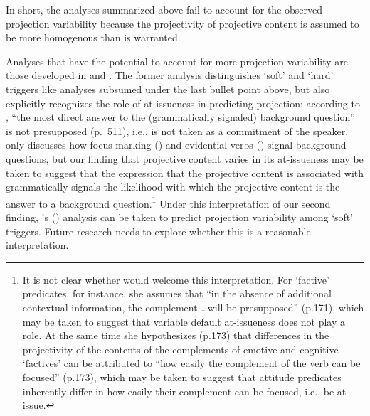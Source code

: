 \documentclass[11pt,fleqn]{article}
\newcommand{\6}{\mbox{$[\hspace*{-.6mm}[$}}
\newcommand{\9}{\mbox{$]\hspace*{-.6mm}]$}}
\newcommand{\citetpos}[1]{\citeauthor{#1}'s (\citeyear{#1})}
\begin{document}
In short, the analyses summarized above fail to account for the observed projection variability because the projectivity of projective content is assumed to be more homogenous than is warranted. 

Analyses that have the potential to account for more projection variability are those developed in \citealt{abrusan2011} and \citealt{abrusan2016}. The former analysis distinguishes `soft' and `hard' triggers like analyses subsumed under the last bullet point above, but also explicitly recognizes the role of at-issueness in predicting projection: according to \citealt{abrusan2011}, ``the most direct answer to the (grammatically signaled) background question'' is not presupposed (p.\ 511), i.e., is not taken as a commitment of the speaker.  \citet{abrusan2011} only discusses how focus marking (\citealt{beaver-belly}) and evidential verbs (\citealt{simons07}) signal background questions, but our finding that projective content varies in its at-issueness may be taken to suggest that the expression that the projective content is associated with grammatically signals the likelihood with which the projective content is the answer to a background question.\footnote{It is not clear whether \citet{abrusan2016} would welcome this interpretation. For `factive' predicates, for instance, she assumes that ``in the absence of additional contextual information, the complement \ldots will be presupposed'' (p.171), which may be taken to suggest that variable default at-issueness does not play a role. At the same time she hypothesizes (p.173) that differences in the projectivity of the contents of the complements of emotive and cognitive `factives' can be attributed to ``how easily the complement of the verb can be focused'' (p.173), which may be taken to suggest that attitude predicates inherently differ in how easily their complement can be focused, i.e., be at-issue.} Under this interpretation of our second finding, \citetpos{abrusan2011} analysis can be taken to predict projection variability among `soft' triggers. Future research needs to explore whether this is a reasonable interpretation.
\end{document}
